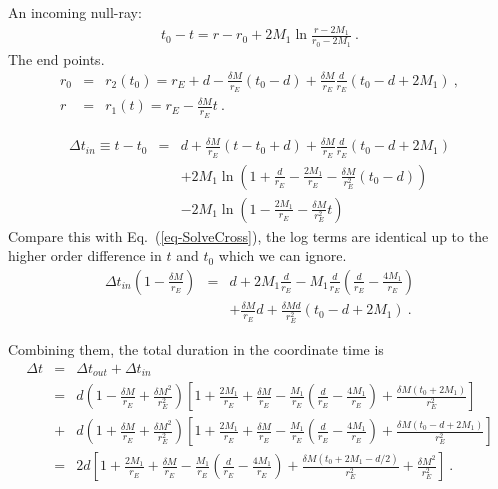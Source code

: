 \documentclass[12pt,letterpaper]{JHEP3}
\begin{document}
An incoming null-ray:
\begin{eqnarray}
t_0 - t = r-r_0 + 2M_{1}\ln\frac{r-2M_{1}}{r_0-2M_{1}}~.
\end{eqnarray}
The end points.
\begin{eqnarray}
r_0 &=& r_2(t_0) = r_E +d - \frac{\delta M}{r_E}(t_0-d) + \frac{\delta M}{r_E}\frac{d}{r_E}(t_0-d+2M_1) ~, \\
r &=& r_1(t) = r_E - \frac{\delta M}{r_E}t~.
\end{eqnarray}

\begin{eqnarray}
\Delta t_{in} \equiv 
t-t_0 &=& d + \frac{\delta M}{r_E}(t-t_0+d) + \frac{\delta M}{r_E}\frac{d}{r_E}(t_0-d+2M_1)
\\ \nonumber
& & +2M_1\ln\left( 1+\frac{d}{r_E} - \frac{2M_1}{r_E} - \frac{\delta M}{r_E^2}(t_0-d) \right)
\\ \nonumber
& & -2M_1\ln\left( 1 - \frac{2M_1}{r_E} - \frac{\delta M}{r_E^2}t \right)
\end{eqnarray}
Compare this with Eq.~(\ref{eq-SolveCross}), the log terms are identical up to the higher order difference in $t$ and $t_0$ which we can ignore.
\begin{eqnarray}
\Delta t_{in}\left(1-\frac{\delta M}{r_E}\right) &=& 
d + 2M_{1}\frac{d}{r_E} - M_{1}\frac{d}{r_E}
\left( \frac{d}{r_E}-\frac{4M_{1}}{r_E} \right) \\ \nonumber
& & + \frac{\delta M}{r_E}d + \frac{\delta Md}{r_E^2} (t_0-d+2M_1)~.
\end{eqnarray}

Combining them, the total duration in the coordinate time is
\begin{eqnarray}
\Delta t &=& \Delta t_{out} + \Delta t_{in} \\ \nonumber
&=& d \left(1 - \frac{\delta M}{r_E} + \frac{\delta M^2}{r_E^2} \right) 
\left[ 1 + \frac{2M_{1}}{r_E} + \frac{\delta M}{r_E} -\frac{M_{1}}{r_E}\left( \frac{d}{r_E}-\frac{4M_{1}}{r_E} \right) + \frac{\delta M (t_0+2M_1)}{r_E^2} \right] \\ \nonumber 
&+& d \left(1 + \frac{\delta M}{r_E} + \frac{\delta M^2}{r_E^2} \right) 
\left[ 1 + \frac{2M_{1}}{r_E} + \frac{\delta M}{r_E} -\frac{M_{1}}{r_E}\left( \frac{d}{r_E}-\frac{4M_{1}}{r_E} \right)  + \frac{\delta M (t_0-d+2M_1)}{r_E^2} \right]  \\ \nonumber
&=& 2d \left[ 1 + \frac{2M_{1}}{r_E} + \frac{\delta M}{r_E} -\frac{M_{1}}{r_E}\left( \frac{d}{r_E}-\frac{4M_{1}}{r_E} \right) + \frac{\delta M (t_0+2M_1-d/2)}{r_E^2} +\frac{\delta M^2}{r_E^2} \right]~.
\end{eqnarray}
\end{document}

